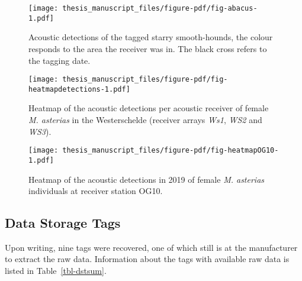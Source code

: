 \documentclass[
  authoryear,
  review,
  3p]{elsarticle}
\begin{document}
\begin{figure}[H]

{\centering \texttt{[image: thesis\_manuscript\_files/figure-pdf/fig-abacus-1.pdf]}

}

\caption{\label{fig-abacus}Acoustic detections of the tagged starry
smooth-hounds, the colour responds to the area the receiver was in. The
black cross refers to the tagging date.}

\end{figure}

\begin{figure}[H]

{\centering \texttt{[image: thesis\_manuscript\_files/figure-pdf/fig-heatmapdetections-1.pdf]}

}

\caption{\label{fig-heatmapdetections}Heatmap of the acoustic detections
per acoustic receiver of female \emph{M. asterias} in the Westerschelde
(receiver arrays \emph{Ws1}, \emph{WS2} and \emph{WS3}).}

\end{figure}

\begin{figure}[H]

{\centering \texttt{[image: thesis\_manuscript\_files/figure-pdf/fig-heatmapOG10-1.pdf]}

}

\caption{\label{fig-heatmapOG10}Heatmap of the acoustic detections in
2019 of female \emph{M. asterias} individuals at receiver station OG10.}

\end{figure}

\hypertarget{sec-results-dst}{%
\subsection{Data Storage Tags}\label{sec-results-dst}}

Upon writing, nine tags were recovered, one of which still is at the
manufacturer to extract the raw data. Information about the tags with
available raw data is listed in Table~\ref{tbl-dstsum}.
\end{document}
